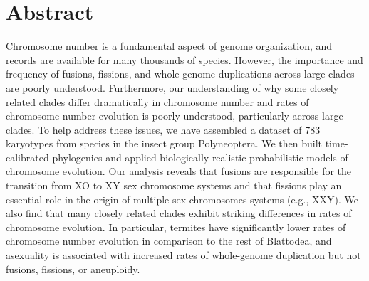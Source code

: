 \section{Abstract}
Chromosome number is a fundamental aspect of genome organization, and records are available for many thousands of species.
However, the importance and frequency of fusions, fissions, and whole-genome duplications across large clades are poorly understood.
Furthermore, our understanding of why some closely related clades differ dramatically in chromosome number and rates of chromosome number evolution is poorly understood, particularly across large clades.
To help address these issues, we have assembled a dataset of 783 karyotypes from species in the insect group Polyneoptera. 
We then built time-calibrated phylogenies and applied biologically realistic probabilistic models of chromosome evolution.
Our analysis reveals that fusions are responsible for the transition from XO to XY sex chromosome systems and that fissions play an essential role in the origin of multiple sex chromosomes systems (e.g., XXY).
We also find that many closely related clades exhibit striking differences in rates of chromosome evolution.
In particular, termites have significantly lower rates of chromosome number evolution in comparison to the rest of Blattodea, and asexuality is associated with increased rates of whole-genome duplication but not fusions, fissions, or aneuploidy.

